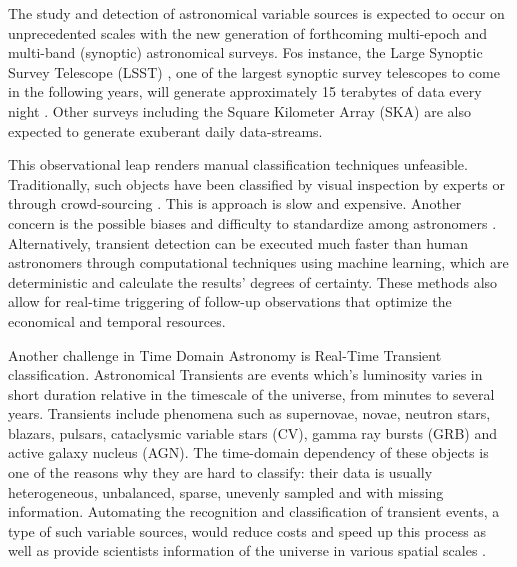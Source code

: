 
The study and detection of astronomical variable sources is expected
to occur on unprecedented scales with the new generation of
forthcoming multi-epoch and multi-band (synoptic) astronomical
surveys. 
Fos instance, the Large Synoptic Survey Telescope (LSST)
\citep{0805.2366}, one of the largest synoptic survey telescopes to
come in the following years, will generate approximately 15 terabytes
of data every night \citep{1512.07914}.  
Other surveys including the Square Kilometer Array (SKA) are also expected
to generate exuberant daily data-streams. 

This observational leap renders manual classification techniques
unfeasible.   
Traditionally, such objects have been classified by visual inspection
by experts or through crowd-sourcing
\citep{1011.2199,0708.2750}. 
This is approach is slow and expensive.
Another concern is the possible biases and difficulty to standardize among 
astronomers \citep{1104.3142}. 
Alternatively, transient detection can be executed much faster than
human astronomers through computational techniques using machine
learning, 
which are deterministic and calculate the results' degrees of
certainty. 
These methods also allow for real-time triggering of follow-up
observations that optimize the economical and temporal resources. 
 

Another challenge in  Time Domain Astronomy is Real-Time Transient classification. 
Astronomical Transients are events which's luminosity varies in short duration
relative in the timescale of the universe, from minutes to several
years. 
Transients include phenomena such as supernovae, novae, neutron
stars, blazars, pulsars, cataclysmic variable stars (CV), gamma ray
bursts (GRB) and active galaxy nucleus (AGN). 
The time-domain dependency of these objects is one of the reasons why
they are hard to classify: their data is usually heterogeneous,
unbalanced, sparse, unevenly sampled and with missing information. 
Automating the recognition and classification of transient events, a type of such
variable sources, would reduce costs and speed up this process as well
as provide scientists information of the universe in various spatial
scales \citep{2011arXiv1110.4655D}.  

